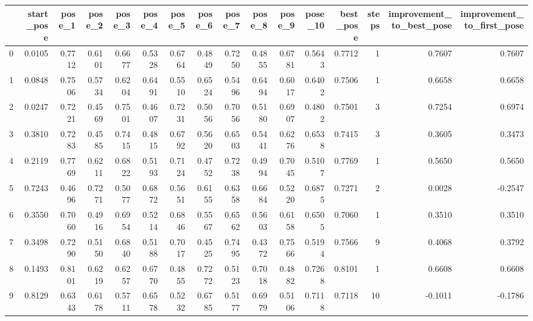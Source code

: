 \begin{tabular}{lrrrrrrrrrrrrrrr}
\toprule
{} &  start\_pose &  pose\_1 &  pose\_2 &  pose\_3 &  pose\_4 &  pose\_5 &  pose\_6 &  pose\_7 &  pose\_8 &  pose\_9 &  pose\_10 &  best\_pose &  steps &  improvement\_to\_best\_pose &  improvement\_to\_first\_pose \\
\midrule
0   &      0.0105 &  0.7712 &  0.6101 &  0.6677 &  0.5328 &  0.6764 &  0.4849 &  0.7250 &  0.4855 &  0.6781 &   0.5643 &     0.7712 &      1 &                    0.7607 &                     0.7607 \\
1   &      0.0848 &  0.7506 &  0.5734 &  0.6204 &  0.6491 &  0.5510 &  0.6524 &  0.5496 &  0.6494 &  0.6017 &   0.6402 &     0.7506 &      1 &                    0.6658 &                     0.6658 \\
2   &      0.0247 &  0.7221 &  0.4569 &  0.7501 &  0.4607 &  0.7231 &  0.5056 &  0.7056 &  0.5180 &  0.6907 &   0.4802 &     0.7501 &      3 &                    0.7254 &                     0.6974 \\
3   &      0.3810 &  0.7283 &  0.4585 &  0.7415 &  0.4815 &  0.6792 &  0.5620 &  0.6503 &  0.5441 &  0.6276 &   0.6538 &     0.7415 &      3 &                    0.3605 &                     0.3473 \\
4   &      0.2119 &  0.7769 &  0.6211 &  0.6822 &  0.5193 &  0.7124 &  0.4752 &  0.7238 &  0.4994 &  0.7045 &   0.5107 &     0.7769 &      1 &                    0.5650 &                     0.5650 \\
5   &      0.7243 &  0.4696 &  0.7271 &  0.5077 &  0.6872 &  0.5651 &  0.6155 &  0.6358 &  0.6684 &  0.5220 &   0.6875 &     0.7271 &      2 &                    0.0028 &                    -0.2547 \\
6   &      0.3550 &  0.7060 &  0.4916 &  0.6954 &  0.5214 &  0.6846 &  0.5567 &  0.6562 &  0.5603 &  0.6158 &   0.6505 &     0.7060 &      1 &                    0.3510 &                     0.3510 \\
7   &      0.3498 &  0.7290 &  0.5150 &  0.6840 &  0.5188 &  0.7017 &  0.4525 &  0.7495 &  0.4372 &  0.7566 &   0.5194 &     0.7566 &      9 &                    0.4068 &                     0.3792 \\
8   &      0.1493 &  0.8101 &  0.6219 &  0.6257 &  0.6770 &  0.4855 &  0.7272 &  0.5123 &  0.7018 &  0.4882 &   0.7268 &     0.8101 &      1 &                    0.6608 &                     0.6608 \\
9   &      0.8129 &  0.6343 &  0.6178 &  0.5711 &  0.6578 &  0.5232 &  0.6785 &  0.5177 &  0.6979 &  0.5106 &   0.7118 &     0.7118 &     10 &                   -0.1011 &                    -0.1786 \\

\end{tabular}
